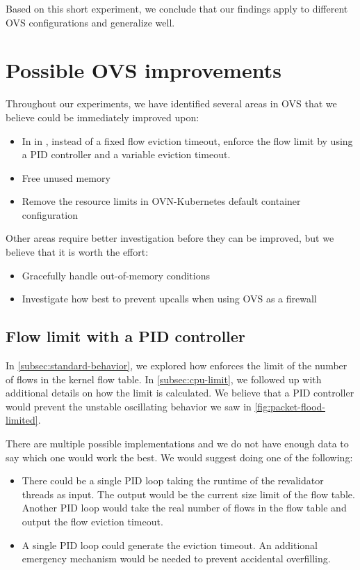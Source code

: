 Based on this short experiment, we conclude that our findings apply to different OVS configurations and generalize well.


\section{Possible OVS improvements}
\label{sec:improv}

Throughout our experiments, we have identified several areas in OVS that we believe could be immediately improved upon:

\begin{itemize}
    \item In in , instead of a fixed flow eviction timeout, enforce the flow limit by using a PID controller and a variable eviction timeout.
    \item Free unused memory
    \item Remove the resource limits in OVN-Kubernetes default container configuration
\end{itemize}

Other areas require better investigation before they can be improved, but we believe that it is worth the effort:

\begin{itemize}
    \item Gracefully handle out-of-memory conditions
    \item Investigate how best to prevent upcalls when using OVS as a firewall
\end{itemize}

\subsection{Flow limit with a PID controller}

In \cref{subsec:standard-behavior}, we explored how  enforces the limit of the number of flows in the kernel flow table. In \cref{subsec:cpu-limit}, we followed up with additional details on how the limit is calculated. We believe that a PID controller would prevent the unstable oscillating behavior we saw in \cref{fig:packet-flood-limited}.

There are multiple possible implementations and we do not have enough data to say which one would work the best. We would suggest doing one of the following:

\begin{itemize}
    \item There could be a single PID loop taking the runtime of the revalidator threads as input. The output would be the current size limit of the flow table. Another PID loop would take the real number of flows in the flow table and output the flow eviction timeout.

    \item A single PID loop could generate the eviction timeout. An additional emergency mechanism would be needed to prevent accidental overfilling.
\end{itemize}

